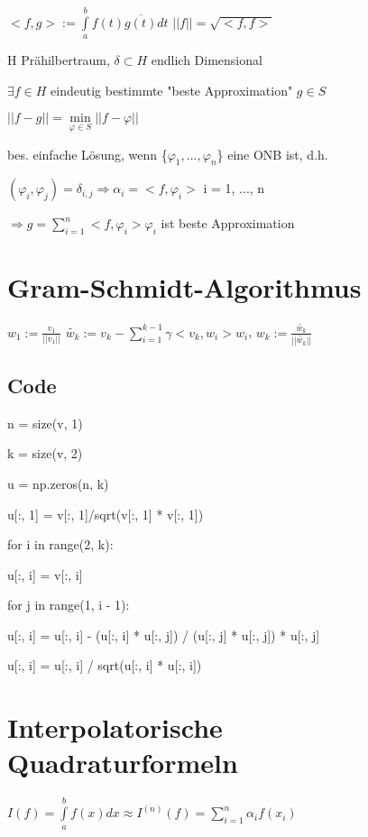 \documentclass[12pt,a4paper]{article} %
\newcommand*\conj[1]{\overline{#1}}
\newcommand*\tab[1][1cm]{\hspace*{#1}}
\begin{document}
	$<f, g>:= \int\limits_{a}^{b}f(t)\conj{g(t)}dt$ \tab $||f|| = \sqrt{<f, f>}$
	
	H Prähilbertraum, $\delta \subset H$ endlich Dimensional
	
	$\exists f \in H$ eindeutig bestimmte "beste Approximation" $g \in S$
	
	\tab $||f - g|| = \min\limits_{\varphi \in S}||f - \varphi||$
	
	bes. einfache Lösung, wenn \{$\varphi_1, ..., \varphi_n$\} eine ONB ist, d.h.
	
	$(\varphi_i, \varphi_j) = \delta_{i, j} \Rightarrow \alpha_i = <f, \varphi_i>$ \tab i = 1, ..., n
	
	\tab $\Rightarrow g = \sum\limits_{i = 1}^{n}<f, \varphi_i>\varphi_i$ ist beste Approximation
	
	\newpage
	
	\section{Gram-Schmidt-Algorithmus}
	
	$w_1 := \frac{v_1}{||v_1||}$ \space $\tilde{w_k}:=v_k - \sum\limits_{i = 1}^{k - 1}\gamma<v_k, w_i>w_i$, \space $w_k := \frac{\tilde{w_k}}{||\tilde{w_k}||}$
	
	\subsection{Code}
	
	n = size(v, 1)
	
	k = size(v, 2)
	
	u = np.zeros(n, k)
	
	u[:, 1] = v[:, 1]/sqrt(v[:, 1] * v[:, 1])
	
	for i in range(2, k):
	
	\tab u[:, i] = v[:, i]
	
	\tab for j in range(1, i - 1):
	
	\tab \tab u[:, i] = u[:, i] - (u[:, i] * u[:, j]) / (u[:, j] * u[:, j]) * u[:, j]
	
	\tab u[:, i] = u[:, i] / sqrt(u[:, i] * u[:, i])
	
	\newpage
	
	\section{Interpolatorische Quadraturformeln}
	
	$I(f) = \int\limits_{a}^{b}f(x)dx \approx I^{(n)}(f) = \sum\limits_{i = 1}^{n}\alpha_if(x_i)$
	
\end{document}
